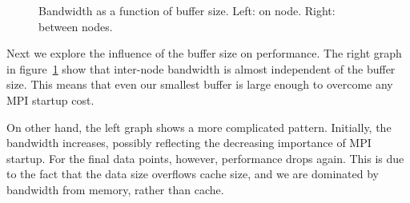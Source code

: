 \begin{figure}
  \pgfplotsset{width=3.5in,compat=1.7}
  \hbox\bgroup

  \egroup
  \caption{Bandwidth as a function of buffer size. Left: on node. Right: between nodes.}
  \label{fig:hbw-interintra-b}
\end{figure}

Next we explore the influence of the buffer size on performance.
The right graph in figure~\ref{fig:hbw-interintra-b}
show that inter-node bandwidth is almost independent of the buffer size.
This means that even our smallest buffer is large enough to overcome
any MPI startup cost.

On other hand, the left graph shows a more complicated pattern.
Initially, the bandwidth increases, possibly reflecting
the decreasing importance of MPI startup.
For the final data points, however, performance drops again.
This is due to the fact that the data size overflows
cache size, and we are dominated by bandwidth from memory, rather than cache.


